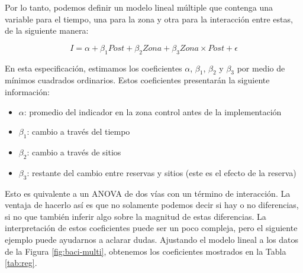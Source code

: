 \documentclass[]{krantz}
\providecommand{\tightlist}{%
  \setlength{\itemsep}{0pt}\setlength{\parskip}{0pt}}
\begin{document}
Por lo tanto, podemos definir un modelo lineal múltiple que contenga una variable para el tiempo, una para la zona y otra para la interacción entre estas, de la siguiente manera:

\begin{equation} 
I = \alpha + \beta_1Post + \beta_2Zona + \beta_3Zona \times Post + \epsilon
\label{eq:did}
\end{equation}

En esta especificación, estimamos los coeficientes \(\alpha\), \(\beta_1\), \(\beta_2\) y \(\beta_3\) por medio de mínimos cuadrados ordinarios. Estos coeficientes presentarán la siguiente información:

\begin{itemize}
\tightlist
\item
  \(\alpha\): promedio del indicador en la zona control antes de la implementación
\item
  \(\beta_1\): cambio a través del tiempo
\item
  \(\beta_2\): cambio a través de sitios
\item
  \(\beta_3\): restante del cambio entre reservas y sitios (este es el efecto de la reserva)
\end{itemize}

Esto es quivalente a un ANOVA de dos vías con un término de interacción. La ventaja de hacerlo así es que no solamente podemos decir si hay o no diferencias, si no que también inferir algo sobre la magnitud de estas diferencias. La interpretación de estos coeficientes puede ser un poco compleja, pero el siguiente ejemplo puede ayudarnos a aclarar dudas. Ajustando el modelo lineal a los datos de la Figura \ref{fig:baci-multi}, obtenemos los coeficientes mostrados en la Tabla \ref{tab:reg}.
\end{document}
